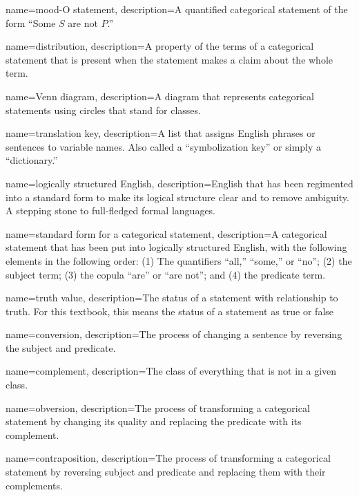 {
name=mood-O statement,
description={A quantified categorical statement of the form ``Some $S$ are not $P$.''}
}

{
name=distribution,
description={A property of the terms of a categorical statement that is present when the statement makes a claim about the whole term.}
}

{
name=Venn diagram,
description={A diagram that represents categorical statements using circles that stand for classes.}
}

{
name=translation key,
description={A list that assigns English phrases or sentences to variable names. Also called a ``symbolization key''  or simply a ``dictionary.''}
}

{
name=logically structured English,
description={English that has been regimented into a standard form to make its logical structure clear and to remove ambiguity. A stepping stone to full-fledged formal languages.}
}

{
name=standard form for a categorical statement,
description={A categorical statement that has been put into logically structured English, with the following elements in the following order: (1) The quantifiers ``all,'' ``some,'' or ``no''; (2) the subject term; (3) the copula ``are'' or ``are not''; and (4) the predicate term.}
}

{
  name=truth value,
  description={The status of a statement with relationship to truth. For  this textbook, this means the status of a statement as true or false}
}

{
name=conversion,
description={The process of changing a sentence by reversing the subject and predicate.}
}

{
name=complement,
description={The class of everything that is not in a given class.}
}

{
name=obversion,
description={The process of transforming a categorical statement by changing its quality and replacing the predicate with its complement.}
}

{
name=contraposition,
description={The process of transforming a categorical statement by reversing subject and predicate and replacing them with their complements.}
}
